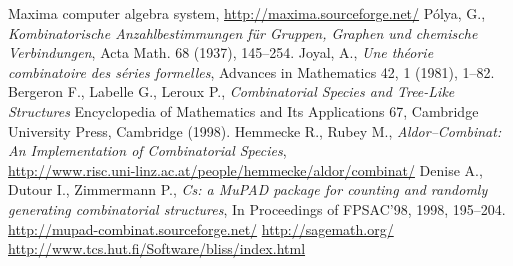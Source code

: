 \documentclass[11pt]{article}
\newcommand{\LINK}[1]{\href{#1}{#1}}
\begin{document}
\begin{thebibliography}{10}

 Maxima computer algebra system,
	\LINK{http://maxima.sourceforge.net/}
 P\'olya, G., {\em Kombinatorische Anzahlbestimmungen
	f\"ur Gruppen, Graphen und chemische Verbindungen},
	Acta Math. 68 (1937), 145--254.
 Joyal, A., {\em Une th\'eorie combinatoire des
	s\'eries formelles}, Advances in Mathematics 42, 1 (1981), 1--82.
  Bergeron F., Labelle G., Leroux P.,
	{\em Combinatorial Species and Tree-Like Structures}
	Encyclopedia of Mathematics and Its Applications 67,
	Cambridge University Press, Cambridge (1998).
 Hemmecke R., Rubey M.,
	{\em Aldor--Combinat: An Implementation of Combinatorial Species},\\
	\LINK{http://www.risc.uni-linz.ac.at/people/hemmecke/aldor/combinat/}
 Denise A., Dutour I., Zimmermann P.,
	{\em Cs: a MuPAD package for counting and randomly generating
	combinatorial structures},
	In Proceedings of FPSAC'98, 1998, 195--204.
 \LINK{http://mupad-combinat.sourceforge.net/}
 \LINK{http://sagemath.org/}
 \LINK{http://www.tcs.hut.fi/Software/bliss/index.html}

\end{thebibliography}
\end{document}
